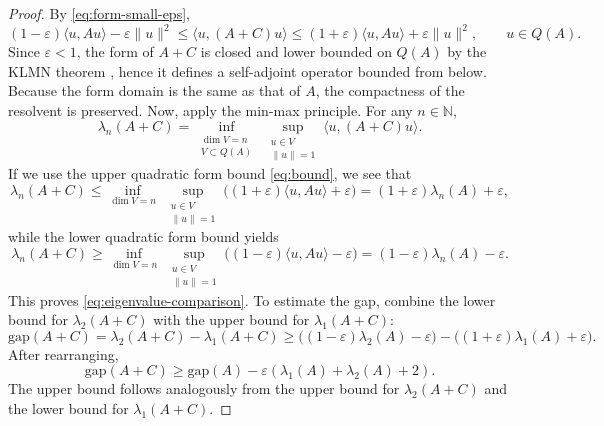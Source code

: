 \documentclass[11pt]{amsart}
\newcommand{\1}{\mathbbm{1}}
\theoremstyle{plain}
\newcommand{\gap}{\mathrm{gap}}
\theoremstyle{definition}
\theoremstyle{remark}
\numberwithin{equation}{section}
\begin{document}
\begin{proof}
By \eqref{eq:form-small-eps},
\begin{equation}
\label{eq:bound}
(1-\varepsilon)\langle u,Au\rangle-\varepsilon\|u\|^2
\le \langle u,(A+C)u\rangle
\le (1+\varepsilon)\langle u,Au\rangle+\varepsilon\|u\|^2,
\qquad u\in Q(A).
\end{equation}
Since $\varepsilon<1$, the form of $A+C$ is closed and lower bounded on $Q(A)$ by the KLMN theorem \cite{Schmdgen2012}, hence it defines a self-adjoint operator bounded from below. Because the form domain is the same as that of $A$, the compactness of the resolvent is preserved.
Now, apply the min-max principle. For any $n\in\mathbb N$,
\[
\lambda_n(A+C)
=
\inf_{\substack{\dim V=n\\V \subset Q(A)}}\ \sup_{\substack{u\in V\\ \|u\|=1}}
\langle u,(A+C)u\rangle.
\]
If we use the upper quadratic form bound \eqref{eq:bound}, we see that 
\[
\lambda_n(A+C)
\le
\inf_{\dim V=n}\ \sup_{\substack{u\in V\\ \|u\|=1}}
\bigl((1+\varepsilon)\langle u,Au\rangle+\varepsilon\bigr)
=
(1+\varepsilon)\lambda_n(A)+\varepsilon,
\]
while the lower quadratic form bound yields
\[
\lambda_n(A+C)
\ge
\inf_{\dim V=n}\ \sup_{\substack{u\in V\\ \|u\|=1}}
\bigl((1-\varepsilon)\langle u,Au\rangle-\varepsilon\bigr)
=
(1-\varepsilon)\lambda_n(A)-\varepsilon.
\]
This proves \eqref{eq:eigenvalue-comparison}.
To estimate the gap, combine the lower bound for $\lambda_2(A+C)$ with the upper bound for $\lambda_1(A+C)$:
\[
\gap(A+C)
=
\lambda_2(A+C)-\lambda_1(A+C)
\ge
\bigl((1-\varepsilon)\lambda_2(A)-\varepsilon\bigr)
-
\bigl((1+\varepsilon)\lambda_1(A)+\varepsilon\bigr).
\]
After rearranging,
\[
\gap(A+C)\ge \gap(A)-\varepsilon(\lambda_1(A)+\lambda_2(A)+2).
\]
 The upper bound follows analogously from the upper bound for $\lambda_2(A+C)$ and the lower bound for $\lambda_1(A+C)$.
\end{proof}
\end{document}
